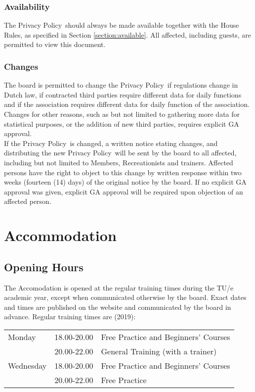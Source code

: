 \documentclass[a4paper]{article}
\newcommand{\Ahr}{House Rules} %
\newcommand{\App}{Privacy Policy}
\begin{document}
\subsubsection{Availability}
The \App\ should always be made available together with the { \Ahr}, as specified in Section \ref{section:available}. All affected, including { guests}, are permitted to view this document.

\subsubsection{Changes}
The board is permitted to change the \App\ if regulations change in Dutch law, if contracted third parties require different data for daily functions and if the association requires different data for daily function of the association. Changes for other reasons, such as but not limited to gathering more data for statistical purposes, or the addition of new third parties, requires explicit { GA} approval. \\

If the \App\ is changed, a written notice stating changes, and distributing the new \App\ will be sent by the board to all affected, including but not limited to { Members}, { Recreationists} and trainers. Affected persons have the right to object to this change by written response within two weeks (fourteen (14) days) of the original notice by the board. If no explicit { GA} approval was given, explicit { GA} approval will be required upon objection of an affected person.

\section{Accommodation}
\subsection{Opening Hours}
\label{section:opening}
The { Accomodation} is opened at the regular training times during the { TU/e} academic year, except when communicated otherwise by the board. Exact dates and times are published on the website and communicated by the board in advance. Regular training times are {\g (2019)}: \\

\begin{tabular}{lll}
Monday    & 18.00-20.00 & Free Practice  and { Beginners’ Course}s \\
          & 20.00-22.00 & { General Training} (with a trainer)     \\
Wednesday & 18.00-20.00 & Free Practice and  { Beginners’ Course}s  \\
          & 20.00-22.00 & Free Practice                        
\end{tabular}
\end{document}
